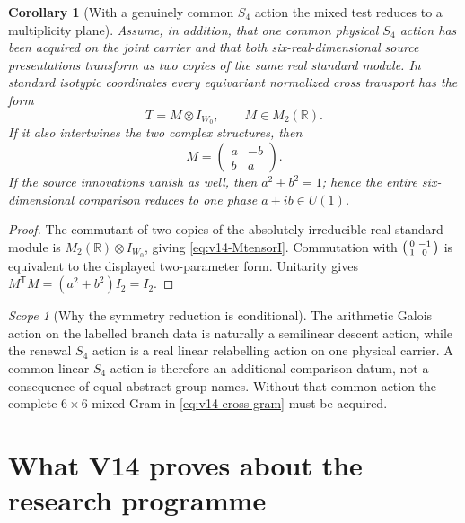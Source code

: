 \documentclass[11pt]{article}
\newtheorem{corollary}[corollary]{Corollary}
\theoremstyle{definition}
\theoremstyle{remark}
\newtheorem{scope}[scope]{Scope}
\newcommand{\R}{\mathbb R}
\begin{document}
\begin{corollary}[With a genuinely common $S_4$ action the mixed test reduces to a multiplicity plane]
\label{cor:v14-S4-reduction}
Assume, in addition, that one common physical $S_4$ action has been acquired
on the joint carrier and that both six-real-dimensional source presentations
transform as two copies of the same real standard module.  In standard
isotypic coordinates every equivariant normalized cross transport has the
form
\[
 \boxed{T=M\otimes I_{W_0},\qquad M\in M_2(\R).}
 \label{eq:v14-MtensorI}
\]
If it also intertwines the two complex structures, then
\[
 M=\begin{pmatrix}a&-b\\b&a\end{pmatrix}.
\]
If the source innovations vanish as well, then $a^2+b^2=1$; hence the entire
six-dimensional comparison reduces to one phase $a+ib\in U(1)$.
\end{corollary}

\begin{proof}
The commutant of two copies of the absolutely irreducible real standard
module is $M_2(\R)\otimes I_{W_0}$, giving
\eqref{eq:v14-MtensorI}.  Commutation with
$\begin{psmallmatrix}0&-1\\1&0\end{psmallmatrix}$ is equivalent to the
displayed two-parameter form.  Unitarity gives
$M^{\mathsf T}M=(a^2+b^2)I_2=I_2$.
\end{proof}

\begin{scope}[Why the symmetry reduction is conditional]
The arithmetic Galois action on the labelled branch data is naturally a
semilinear descent action, while the renewal $S_4$ action is a real linear
relabelling action on one physical carrier.  A common linear $S_4$ action is
therefore an additional comparison datum, not a consequence of equal abstract
group names.  Without that common action the complete $6\times6$ mixed Gram
in \eqref{eq:v14-cross-gram} must be acquired.
\end{scope}

\section{What V14 proves about the research programme}
\label{sec:v14-status}
\end{document}
